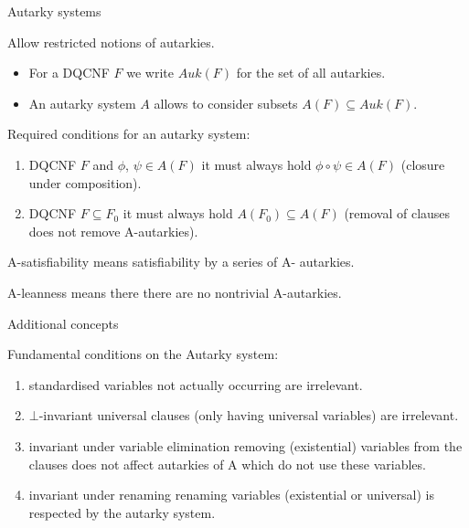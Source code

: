 \documentclass[xcolor=table	]{beamer}
\begin{document}
\begin{frame}{Autarky systems}

Allow restricted notions of autarkies. \newline
\begin{itemize}
    \item For a DQCNF $F$ we write $Auk(F)$ for the set of all autarkies.  
    \item An autarky system $A$ allows to consider subsets $A(F) \subseteq Auk(F)$.
\end{itemize}

\vspace{0.5cm}

Required conditions for an autarky system:
\begin{enumerate}
    \item DQCNF $F$ and $\phi$, $\psi \in A(F)$ it
must always hold $\phi \circ \psi \in A(F)$ (closure under composition).

    \item DQCNF $F \subseteq F_0$ it must always hold $A(F_0) \subseteq A(F)$ (removal of clauses does not remove A-autarkies).
\end{enumerate}

A-satisfiability means satisfiability by a series of A-
autarkies. \newline

A-leanness means there there are no nontrivial A-autarkies.
\end{frame}

\begin{frame}{Additional concepts}

Fundamental conditions on the Autarky system:

\begin{enumerate}
    \item standardised variables not actually occurring are irrelevant.
    \item $\bot$-invariant universal clauses (only having universal variables) are irrelevant.
    \item invariant under variable elimination removing (existential) variables from
the clauses does not affect autarkies of A which do not use these variables.
    \item invariant under renaming renaming variables (existential or universal) is respected by the autarky system.
\end{enumerate}
\end{frame}
\end{document}
